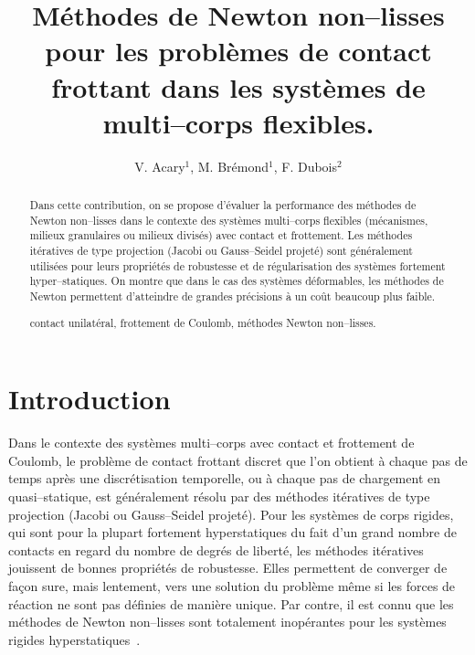 \documentclass{CSMA2017}
\title{Méthodes de Newton non--lisses pour les problèmes de contact frottant dans les systèmes de multi--corps flexibles.}
\author{V. Acary$^1$, M. Brémond$^1$, F. Dubois$^2$}
\newcommand\ndm[1]{}
\begin{document}
\maketitle

\begin{abstract}
Dans cette contribution, on se propose d'évaluer la performance des méthodes de Newton non--lisses dans le contexte des systèmes multi--corps flexibles (mécanismes, milieux granulaires ou milieux divisés) avec contact et frottement. Les méthodes itératives de type projection (Jacobi ou Gauss--Seidel projeté) sont généralement utilisées pour leurs propriétés de robustesse et de régularisation des systèmes fortement hyper--statiques. On montre que dans le cas des systèmes déformables, les méthodes de Newton permettent d'atteindre de grandes précisions à un coût beaucoup plus faible.

\keywords contact unilatéral, frottement de Coulomb, méthodes Newton non--lisses.
\end{abstract}

\section{Introduction}

Dans le contexte des systèmes multi--corps avec contact et frottement de Coulomb, le problème de contact frottant discret que l'on obtient à chaque pas de temps après une discrétisation temporelle, ou à chaque pas de chargement en quasi--statique, est généralement résolu par des méthodes itératives de type projection (Jacobi ou Gauss--Seidel projeté). 
%
Pour les systèmes de corps rigides, qui sont pour la plupart fortement hyperstatiques du fait d'un grand nombre de contacts en regard du nombre de degrés de liberté, les méthodes itératives jouissent de bonnes propriétés de robustesse. Elles permettent de converger de façon sure, mais lentement, vers une solution du problème même si les forces de réaction ne sont pas définies de manière unique. Par contre, il est connu que les méthodes de Newton non--lisses sont totalement inopérantes pour les systèmes rigides hyperstatiques~\cite{bertailsdescoubes:inria-00557706}. \ndm{Une autre citation?}
\end{document}
